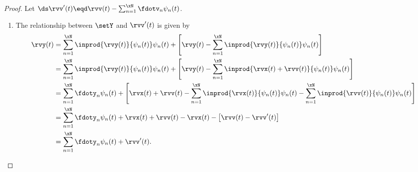 \begin{proof}
Let $\ds\rvv'(t) \eqd \rvv(t) - \sum_{n=1}^\xN \fdotv_n \psi_n(t)$.
\begin{enumerate}
\item The relationship between $\setY$ and $\rvv'(t)$ is given by
\begin{align*}
   \rvy(t)
     &= \sum_{n=1}^\xN \inprod{\rvy(t)}{\psi_n(t)}\psi_n(t) +
        \left[\rvy(t)- \sum_{n=1}^\xN \inprod{\rvy(t)}{\psi_n(t)}\psi_n(t) \right]
   \\&= \sum_{n=1}^\xN \inprod{\rvy(t)}{\psi_n(t)}\psi_n(t) +
        \left[\rvy(t)- \sum_{n=1}^\xN \inprod{\rvx(t)+\rvv(t)}{\psi_n(t)}\psi_n(t) \right]
   \\&= \sum_{n=1}^\xN \fdoty_n\psi_n(t) +
        \left[\rvx(t)+\rvv(t) - \sum_{n=1}^\xN \inprod{\rvx(t)}{\psi_n(t)}\psi_n(t)
                        - \sum_{n=1}^\xN \inprod{\rvv(t)}{\psi_n(t)}\psi_n(t) \right]
   \\&= \sum_{n=1}^\xN \fdoty_n\psi_n(t) +
        \rvx(t)+\rvv(t) - \rvx(t) - \left[ \rvv(t) - \rvv'(t)\right]
   \\&= \sum_{n=1}^\xN \fdoty_n\psi_n(t) + \rvv'(t).
\end{align*}


\end{enumerate}
\end{proof}
